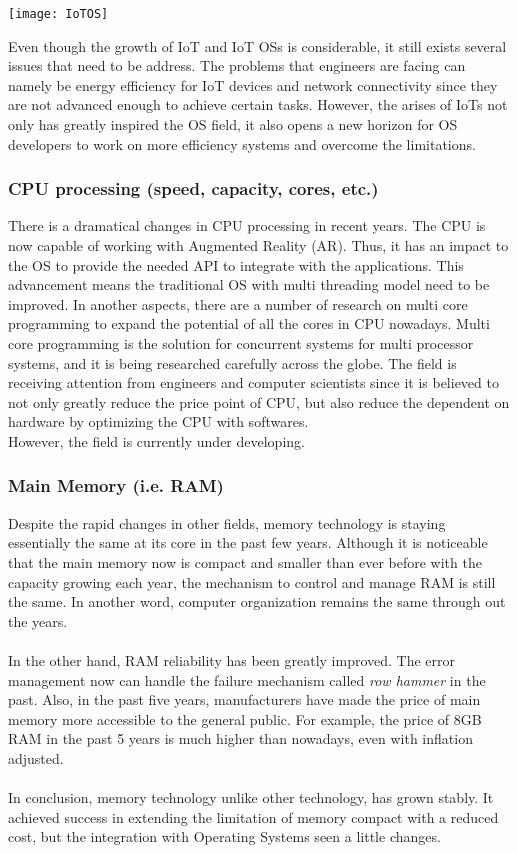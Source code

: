 \begin{centering}
    \texttt{[image: IoTOS]} 
\end{centering}

Even though the growth of IoT and IoT OSs is considerable, it still exists several issues that need to be address. The problems that engineers are facing can namely be energy efficiency for IoT devices and network connectivity since they are not advanced enough to achieve certain tasks. However, the arises of IoTs not only has greatly inspired the OS field, it also opens a new horizon for OS developers to work on more efficiency systems and overcome the limitations.

\subsubsection{CPU processing (speed, capacity, cores, etc.)}

There is a dramatical changes in CPU processing in recent years. The CPU is now capable of working with Augmented Reality (AR).
Thus, it has an impact to the OS to provide the needed API to integrate with the applications. 
This advancement means the traditional OS with multi threading model need to be improved.
In another aspects, there are a number of research on multi core programming to expand the potential of all the cores in CPU nowadays.
Multi core programming is the solution for concurrent systems for multi processor systems, and it is being researched carefully across the globe.
The field is receiving attention from engineers and computer scientists since it is believed to not only greatly reduce the price point of CPU, but also reduce the dependent on hardware by optimizing the CPU with softwares. \\
However, the field is currently under developing.

\subsubsection{Main Memory (i.e. RAM)}
Despite the rapid changes in other fields, memory technology is staying essentially the same at its core in the past few years. 
Although it is noticeable that the main memory now is compact and smaller than ever before with the capacity growing each year, the mechanism to control and manage RAM is still the same. 
In another word, computer organization remains the same through out the years.\\
\\
In the other hand, RAM reliability has been greatly improved. The error management now can handle the failure mechanism called \textit{row hammer} in the past. 
Also, in the past five years, manufacturers have made the price of main memory more accessible to the general public. For example, the price of 8GB RAM in the past 5 years is much higher than nowadays, even with inflation adjusted. \\
\\
In conclusion, memory technology unlike other technology, has grown stably. It achieved success in extending the limitation of memory compact with a reduced cost, but the integration with Operating Systems seen a little changes.

